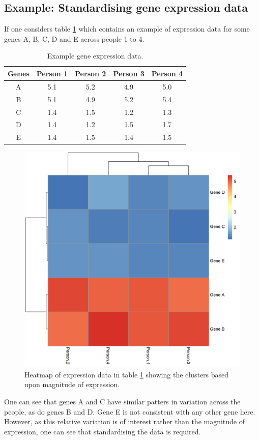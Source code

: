 \documentclass[14pt]{extarticle} %
\begin{document}
	\subsection{Example: Standardising gene expression data} \label{sec:motivating_example_standardisation}
	If one considers table \ref{table:example_gene_expression_data} which contains an example of expression data for some genes A, B, C, D and E across people 1 to 4.
	\begin{table}[!htb] 
		\centering
		\begin{tabular}{c|cccc} 
			Genes 	& Person 1	& Person 2	& Person 3	& Person 4	\\ 
			\hline
			A 		& 5.1		& 5.2 		& 4.9		& 5.0		\\
			B 		& 5.1		& 4.9		& 5.2		& 5.4		\\
			C 		& 1.4		& 1.5		& 1.2		& 1.3		\\
			D 		& 1.4		& 1.2		& 1.5		& 1.7		\\
			E 		& 1.4		& 1.5		& 1.4		& 1.5		
		\end{tabular}
		\caption{Example gene expression data.}
		\label{table:example_gene_expression_data}
	\end{table}
	\begin{figure}[!htb]
		\centering
		\includegraphics[scale=0.55]{Images/example_expression_data.png}
		\caption{Heatmap of expression data in table \ref{table:example_gene_expression_data} showing the clusters based upon magnitude of expression.}
		\label{fig:example_expression_data}
	\end{figure}
	One can see that genes A and C have similar patters in variation across the people, as do genes B and D. Gene E is not consistent with any other gene here. However, as this relative variation is of interest rather than the magnitude of expression, one can see that standardising the data is required. 
	
\end{document}
